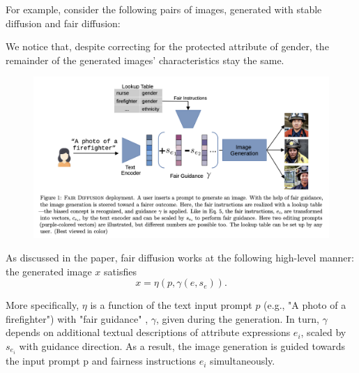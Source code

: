 \documentclass[12pt]{amsart}
\begin{document}
For example, consider the following pairs of images, generated with stable diffusion and fair diffusion: 

\setlength{}

We notice that, despite correcting for the protected attribute of gender, the remainder of the generated images' characteristics stay the same. 
\begin{figure}[H]
    \centering
\includegraphics[scale = 0.65]{FairDiffusion_Method.png}
    \label{fig:fairdiffusion_method}
\end{figure}

As discussed in the paper, fair diffusion works at the following high-level manner: the generated image $x$ satisfies
\[ x = \eta(p, \gamma(e, s_e)).\]

More specifically, $\eta$ is a function of the text input prompt $p$ (e.g., "A photo of a firefighter") with "fair guidance"
, $\gamma$, given during the generation. In turn, $\gamma$ depends on additional textual descriptions of attribute expressions $e_i$, scaled by $s_{e_i}$ with guidance direction. As a result, the image generation is guided towards the input prompt p
and fairness instructions $e_i$ simultaneously. \\
\end{document}
